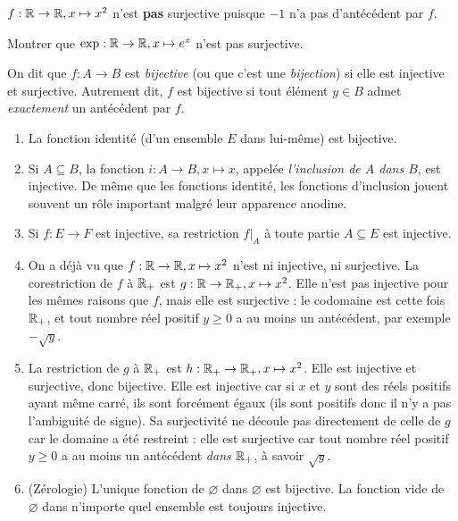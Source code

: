 \begin{exemple}
$f : \mathbb{R}\to \mathbb{R}, x\mapsto x^2$ n'est \textbf{pas} surjective puisque $-1$ n'a pas d'antécédent par $f$.
\end{exemple}

\begin{exercice}
Montrer que  $\exp: \mathbb{R}\to \mathbb{R}, x\mapsto e^x$ n'est pas surjective.
\end{exercice}





\begin{definition}
On dit que $f : A\to B$ est \emph{bijective} (ou que c'est une \emph{bijection}) si elle est injective et surjective. Autrement dit, $f$ est bijective si tout élément $y\in B$ admet \emph{exactement} un antécédent par $f$.
\end{definition}

\begin{exemple}
\begin{enumerate}
\item La fonction identité (d'un ensemble $E$ dans lui-même) est bijective.
\item Si $A\subseteq B$, la fonction $i : A\to B, x\mapsto x$, appelée \emph{l'inclusion de $A$ dans $B$}, est injective. De même que les fonctions identité, les fonctions d'inclusion jouent souvent un rôle important malgré leur apparence anodine.
\item Si $f : E\to F$ est injective, sa restriction $f|_A$ à toute partie $A\subseteq E$ est injective.
\item On a déjà vu que $f : \mathbb{R} \to \mathbb{R}, x\mapsto x^2$ n'est ni injective, ni surjective. La corestriction de $f$ à $\mathbb{R}_+$ est $g : \mathbb{R} \to \mathbb{R}_+, x\mapsto x^2$. Elle n'est pas injective pour les mêmes raisons que $f$, mais elle est surjective : le codomaine est cette fois $\mathbb{R}_+$, et tout nombre réel positif $y\geq 0$ a au moins un antécédent, par exemple $-\sqrt{y}$.
\item La restriction de $g$ à $\mathbb{R}_+$ est $h : \mathbb{R}_+ \to \mathbb{R}_+, x\mapsto x^2$. Elle est injective et surjective, donc bijective. Elle est injective car si $x$ et $y$ sont des réels positifs ayant même carré, ils sont forcément égaux (ils sont positifs donc il n'y a pas l'ambiguité de signe). Sa surjectivité ne découle pas directement de celle de $g$ car le domaine a été restreint : elle est surjective car tout nombre réel positif $y\geq 0$ a au moins un antécédent \emph{dans $\mathbb{R}_+$}, à savoir $\sqrt{y}$.
\item (Zérologie) L'unique fonction de $\varnothing$ dans $\varnothing$ est bijective. La fonction vide de $\varnothing$ dans n'importe quel ensemble est toujours injective.
\end{enumerate}
\end{exemple}

